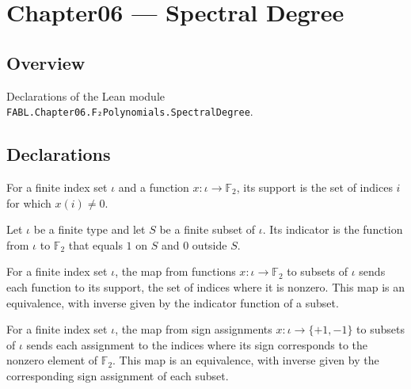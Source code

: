 \chapter{Chapter06 — Spectral Degree}
\section{Overview}

Declarations of the Lean module \texttt{FABL.Chapter06.F₂Polynomials.SpectralDegree}.

\section{Declarations}

\begin{definition}
\leanok
{}
For a finite index set $\iota$ and a function $x\colon\iota\to\mathbb{F}_2$, its support
is the set of indices $i$ for which $x(i)\ne 0$.
\end{definition}

\begin{definition}
\leanok
{}
Let $\iota$ be a finite type and let $S$ be a finite subset of $\iota$. Its indicator is
the function from $\iota$ to $\mathbb{F}_2$ that equals $1$ on $S$ and $0$ outside $S$.
\end{definition}

\begin{definition}
\leanok
{}
For a finite index set $\iota$, the map from functions $x:\iota\to\mathbb{F}_2$ to
subsets of $\iota$ sends each function to its support, the set of indices where it is
nonzero. This map is an equivalence, with inverse given by the indicator function of a
subset.
\end{definition}

\begin{definition}
\label{FABL.indexedSignCubeEquivFinset}
\leanok
{}
For a finite index set $\iota$, the map from sign assignments $x:\iota\to\{+1,-1\}$ to
subsets of $\iota$ sends each assignment to the indices where its sign corresponds to
the nonzero element of $\mathbb{F}_2$. This map is an equivalence, with inverse given by
the corresponding sign assignment of each subset.
\end{definition}


